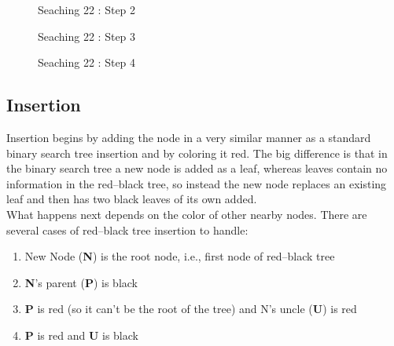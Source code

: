 \documentclass{article}[10pt]
\begin{document}
\begin{figure}
	\centering
	
	\caption{Seaching 22 : Step 2} 
	\label{fig:search2}
\end{figure}

\begin{figure}
	\centering
	
	\caption{Seaching 22 : Step 3}
	\label{fig:search3}
\end{figure}

\begin{figure}
	\centering
	
	\caption{Seaching 22 : Step 4} %
	\label{fig:search4}
\end{figure}


\newpage
\subsection{Insertion}
Insertion begins by adding the node in a very similar manner as a standard binary search tree insertion and by coloring it red. The big difference is that in the binary search tree a new node is added as a leaf, whereas leaves contain no information in the red–black tree, so instead the new node replaces an existing leaf and then has two black leaves of its own added. \\
What happens next depends on the color of other nearby nodes. There are several cases of red–black tree insertion to handle:
\begin{enumerate}
    \item New Node (\textbf{N}) is the root node, i.e., first node of red–black tree
    \item \textbf{N}'s parent (\textbf{P}) is black
    \item \textbf{P} is red (so it can't be the root of the tree) and N's uncle (\textbf{U}) is red
    \item \textbf{P} is red and \textbf{U} is black
\end{enumerate}
\end{document}
